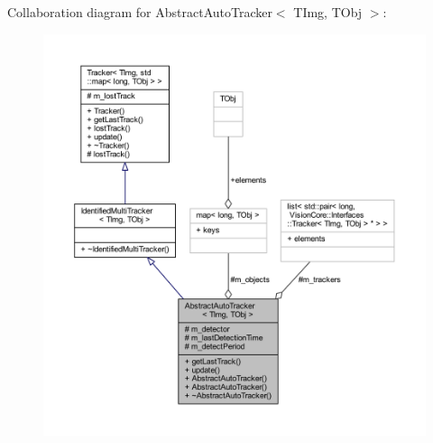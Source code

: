 Collaboration diagram for Abstract\+Auto\+Tracker$<$ T\+Img, T\+Obj $>$\+:
\nopagebreak
\begin{figure}[H]
\begin{center}
\leavevmode
\includegraphics[width=350pt]{class_vision_core_1_1_abstractions_1_1_abstract_auto_tracker__coll__graph}
\end{center}
\end{figure}
